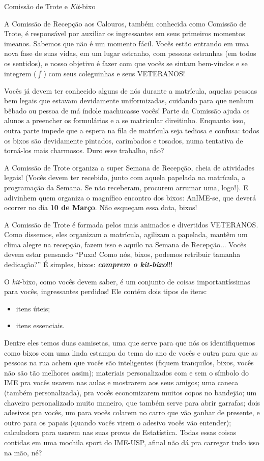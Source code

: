 \begin{secao}{Comissão de Trote e \textit{Kit}-bixo}

A Comissão de Recepção aos Calouros, também conhecida como Comissão de Trote, é
responsável por auxiliar os ingressantes em seus primeiros momentos imeanos.
Sabemos que não é um momento fácil. Vocês estão entrando em uma nova fase de
suas vidas, em um lugar estranho, com pessoas estranhas (em todos os sentidos),
e nosso objetivo é fazer com que vocês se sintam bem-vindos e se integrem
($\int$) com seus coleguinhas e seus VETERANOS!

Vocês já devem ter conhecido alguns de nós durante a matrícula, aquelas pessoas
bem legais que estavam devidamente uniformizadas, cuidando para que nenhum
bêbado ou pessoa de má índole machucasse vocês! Parte da Comissão ajuda os
alunos a preencher os formulários e a se matricular direitinho. Enquanto isso,
outra parte impede que a espera na fila de matrícula seja tediosa e confusa:
todos os bixos são devidamente pintados, carimbados e tosados, numa tentativa
de torná-los mais charmosos. Duro esse trabalho, não?

A Comissão de Trote organiza a super Semana de Recepção, cheia de atividades
legais! (Vocês devem ter recebido, junto com aquela papelada na matrícula, a
programação da Semana. Se não receberam, procurem arrumar uma, logo!).
E adivinhem quem organiza o magnífico encontro dos bixos: AnIME-se, que deverá
ocorrer no dia \textbf{10 de Março}. Não esqueçam essa data, bixos! %

A Comissão de Trote é formada pelos mais animados e divertidos VETERANOS. Como
dissemos, eles organizam a matrícula, agilizam a papelada, mantêm um clima
alegre na recepção, fazem isso e aquilo na Semana de Recepção...
Vocês devem estar pensando ``Puxa! Como nós, bixos, podemos retribuir
tamanha dedicação?'' É simples, bixos: {\bf\em comprem o \textit{kit}-bixo}!!!

O \textit{kit}-bixo, como vocês devem saber, é um conjunto de coisas
importantíssimas para vocês, ingressantes perdidos! Ele contém dois tipos de
itens:
\begin{itemize}
\item itens úteis;
\item itens essenciais.
\end{itemize} %
Dentre eles temos duas camisetas, uma que serve para que nós os identifiquemos como
bixos com uma linda estampa do tema do ano de vocês e outra para que as pessoas na 
rua achem que vocês são inteligentes (fiquem
tranquilos, bixos, vocês não são tão melhores assim); materiais personalizados
com e sem o símbolo do IME pra vocês usarem nas aulas e mostrarem aos seus
amigos; uma caneca (também personalizada), pra vocês economizarem muitos copos
no bandejão; um chaveiro
personalizado muito maneiro, que também serve para abrir garrafas; dois adesivos
pra vocês, um para vocês colarem no carro que vão ganhar de presente, e outro
para os papais (quando vocês virem o adesivo vocês vão entender); calculadora para usarem nas suas
provas de Estatística. Todas
essas coisas contidas em uma mochila sport do IME-USP, afinal não dá pra
carregar tudo isso na mão, né?


\end{secao}
